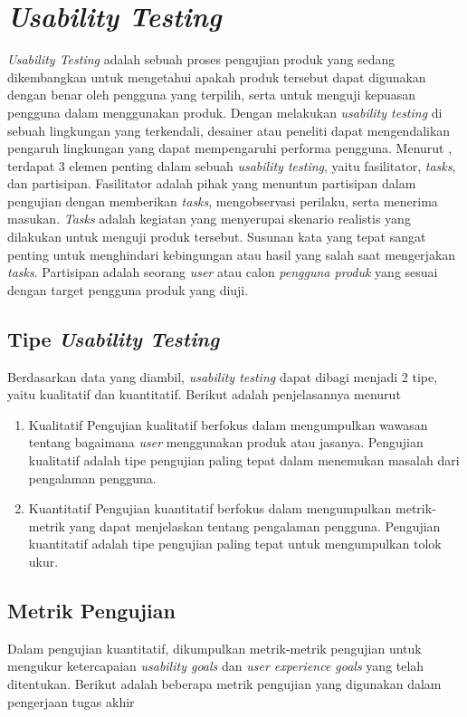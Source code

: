 \section{\textit{Usability Testing}}
\textit{Usability Testing} adalah sebuah proses pengujian produk yang sedang dikembangkan untuk mengetahui apakah produk tersebut dapat digunakan dengan benar oleh pengguna yang terpilih, serta untuk menguji kepuasan pengguna dalam menggunakan produk. Dengan melakukan \textit{usability testing} di sebuah lingkungan yang terkendali, desainer atau peneliti dapat mengendalikan pengaruh lingkungan yang dapat mempengaruhi performa pengguna. \parencite{PreeceRogersSharp15} Menurut \textcite{nielsengrouptesting}, terdapat 3 elemen penting dalam sebuah \textit{usability testing}, yaitu fasilitator, \textit{tasks}, dan partisipan. Fasilitator adalah pihak yang menuntun partisipan dalam pengujian dengan memberikan \textit{tasks}, mengobservasi perilaku, serta menerima masukan. \textit{Tasks} adalah kegiatan yang menyerupai skenario realistis yang dilakukan untuk menguji produk tersebut. Susunan kata yang tepat sangat penting untuk menghindari kebingungan atau hasil yang salah saat mengerjakan \textit{tasks}. Partisipan adalah seorang \textit{user} atau calon \textit{pengguna produk} yang sesuai dengan target pengguna produk yang diuji. 

\subsection{Tipe \textit{Usability Testing}}
Berdasarkan data yang diambil, \textit{usability testing} dapat dibagi menjadi 2 tipe, yaitu kualitatif dan kuantitatif. Berikut adalah penjelasannya menurut \textcite{nielsengrouptesting}

\begin{enumerate}
  \item Kualitatif
  \subitem Pengujian kualitatif berfokus dalam mengumpulkan wawasan tentang bagaimana \textit{user} menggunakan produk atau jasanya. Pengujian kualitatif adalah tipe pengujian paling tepat dalam menemukan masalah dari pengalaman pengguna.

  \item Kuantitatif
  \subitem Pengujian kuantitatif berfokus dalam mengumpulkan metrik-metrik yang dapat menjelaskan tentang pengalaman pengguna. Pengujian kuantitatif adalah tipe pengujian paling tepat untuk mengumpulkan tolok ukur. 
\end{enumerate}


\subsection{Metrik Pengujian}
Dalam pengujian kuantitatif, dikumpulkan metrik-metrik pengujian untuk mengukur ketercapaian \textit{usability goals} dan \textit{user experience goals} yang telah ditentukan. Berikut adalah beberapa metrik pengujian yang digunakan dalam pengerjaan tugas akhir


